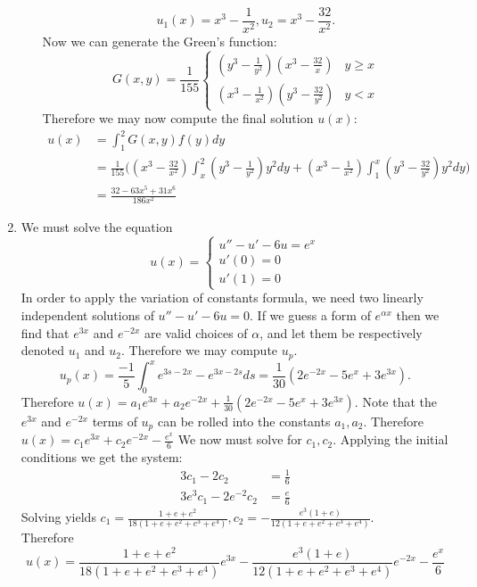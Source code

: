 \documentclass[12pt, letterpaper]{article}
\begin{document}
\begin{enumerate}
\begin{enumerate}
			$$
			u_1(x) = x^3 - \frac{1}{x^2}, u_2 = x^3 - \frac{32}{x^2}.
			$$
			Now we can generate the Green's function:
			$$
				G(x,y) = \frac{1}{155} \begin{cases}
					(y^3 - \frac{1}{y^2})(x^3-\frac{32}{x}) & y \geq x\\
		(x^3 - \frac{1}{x^2})(y^3-\frac{32}{y^2}) & y < x			
				\end{cases}
			$$
			Therefore we may now compute the final solution $u(x)$:
			\begin{align*}
			u(x) &= \int_1^2 G(x,y) f(y) dy \\
			&= \frac{1}{155}\bigg((x^3-\frac{32}{x^2}) \int_x^2 (y^3 - \frac{1}{y^2})y^2 dy + (x^3 - \frac{1}{x^2})\int_1^x (y^3 - \frac{32}{y^2})y^2 dy \bigg)\\
			&= \frac{32 - 63 x^5 + 31 x^6}{186 x^2}
			\end{align*}
		\end{enumerate}
		\item We must solve the equation 
		$$
		u(x) = \begin{cases}
			u'' - u' - 6u = e^x\\
			u'(0) = 0\\
			u'(1) = 0
			\end{cases}
		$$
		In order to apply the variation of constants formula, we need two linearly independent solutions of $u'' - u' - 6 u = 0$.  If we guess a form of $e^{\alpha x}$ then we find that $e^{3x}$ and $e^{-2x}$ are valid choices of $\alpha$, and let them be respectively denoted $u_1$ and $u_2$.  Therefore we may compute $u_p$.  \\
		$$
		u_p (x) = \frac{-1}{5}\int_0^x e^{3s-2x}-e^{3x-2s} ds = \frac{1}{30}(2e^{-2x} -5e^x + 3e^{3x}).
		$$
		Therefore $u(x) = a_1 e^{3x} + a_2 e^{-2x} + \frac{1}{30}(2e^{-2x} -5e^x + 3e^{3x})$.  Note that the $e^{3x}$ and $e^{-2x}$ terms of $u_p$ can be rolled into the constants $a_1,a_2$.  Therefore $u(x) = c_1 e^{3x} + c_2 e^{-2x} - \frac{e^x}{6}$  We now must solve for $c_1,c_2$.  Applying the initial conditions we get the system:\\
		\begin{align*}
			3c_1 - 2 c_2 &= \frac{1}{6}\\
			3e^3 c_1 - 2 e^{-2} c_2 &= \frac{e}{6}
		\end{align*}
		Solving yields $c_1 = \displaystyle \frac{1+e+e^2}{18 \left(1+e+e^2+e^3+e^4\right)}, c_2 = -\frac{e^3 (1+e)}{12 \left(1+e+e^2+e^3+e^4\right)}$.\\
		Therefore 
		$$
		u(x) = \frac{1+e+e^2}{18 \left(1+e+e^2+e^3+e^4\right)} e^{3x} 	-\frac{e^3 (1+e)}{12 \left(1+e+e^2+e^3+e^4\right)} e^{-2x} -\frac{e^x}{6}	
		$$
	\end{enumerate}
\end{document}
